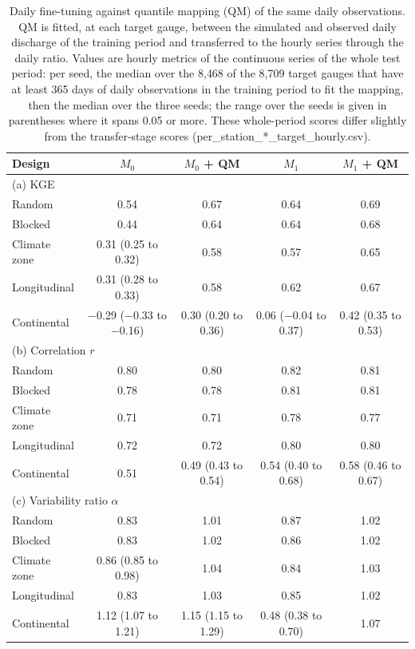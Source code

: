 \begin{table}[H]
\caption{Daily fine-tuning against quantile mapping (QM) of the same daily observations. QM is fitted, at each target gauge, between the simulated and observed daily discharge of the training period and transferred to the hourly series through the daily ratio. Values are hourly metrics of the continuous series of the whole test period: per seed, the median over the 8{,}468 of the 8{,}709 target gauges that have at least 365 days of daily observations in the training period to fit the mapping, then the median over the three seeds; the range over the seeds is given in parentheses where it spans 0.05 or more. These whole-period scores differ slightly from the transfer-stage scores (per_station_*_target_hourly.csv).}
\label{tab:qm}
\centering
\small
\begin{tabular*}{\linewidth}{@{\extracolsep{\fill}}l cccc}
\toprule
Design & $M_0$ & $M_0$ + QM & $M_1$ & $M_1$ + QM \\
\midrule
\multicolumn{5}{l}{(a) KGE} \\
\quad Random & 0.54 & 0.67 & 0.64 & 0.69 \\
\quad Blocked & 0.44 & 0.64 & 0.64 & 0.68 \\
\quad Climate zone & 0.31 (0.25 to 0.32) & 0.58 & 0.57 & 0.65 \\
\quad Longitudinal & 0.31 (0.28 to 0.33) & 0.58 & 0.62 & 0.67 \\
\quad Continental & $-$0.29 ($-$0.33 to $-$0.16) & 0.30 (0.20 to 0.36) & 0.06 ($-$0.04 to 0.37) & 0.42 (0.35 to 0.53) \\
\midrule
\multicolumn{5}{l}{(b) Correlation $r$} \\
\quad Random & 0.80 & 0.80 & 0.82 & 0.81 \\
\quad Blocked & 0.78 & 0.78 & 0.81 & 0.81 \\
\quad Climate zone & 0.71 & 0.71 & 0.78 & 0.77 \\
\quad Longitudinal & 0.72 & 0.72 & 0.80 & 0.80 \\
\quad Continental & 0.51 & 0.49 (0.43 to 0.54) & 0.54 (0.40 to 0.68) & 0.58 (0.46 to 0.67) \\
\midrule
\multicolumn{5}{l}{(c) Variability ratio $\alpha$} \\
\quad Random & 0.83 & 1.01 & 0.87 & 1.02 \\
\quad Blocked & 0.83 & 1.02 & 0.86 & 1.02 \\
\quad Climate zone & 0.86 (0.85 to 0.98) & 1.04 & 0.84 & 1.03 \\
\quad Longitudinal & 0.83 & 1.03 & 0.85 & 1.02 \\
\quad Continental & 1.12 (1.07 to 1.21) & 1.15 (1.15 to 1.29) & 0.48 (0.38 to 0.70) & 1.07 \\
\bottomrule
\end{tabular*}
\end{table}
